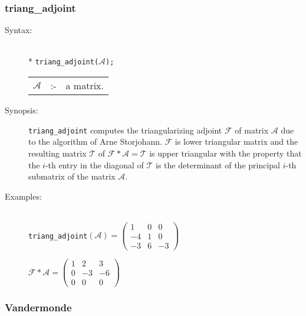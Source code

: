 \subsubsection{triang\_adjoint}
\label{linalg:triang_adjoint}

\begin{description}
\item[Syntax:]\mbox{}\\*
\texttt{triang\_adjoint($\mathcal{A}$);}\\[2mm]
\begin{tabular}{l l l}
$\mathcal{A}$  &:-& a matrix.
\end{tabular}

\item[Synopsis:]

\texttt{triang\_adjoint} computes the triangularizing adjoint $\mathcal{F}$ of
matrix $\mathcal{A}$ due to the algorithm of Arne Storjohann. $\mathcal{F}$ is
lower triangular matrix and the resulting matrix $\mathcal{T}$ of
$\mathcal{F * A = T}$ is upper triangular with the property that the $i$-th
entry in the diagonal of $\mathcal{T}$ is the determinant of the principal
$i$-th submatrix of the matrix $\mathcal{A}$.

\item[Examples:]\mbox{}\\
  \texttt{triang\_adjoint}\((\mathcal{A}) =
  \begin{pmatrix} 1 & 0 & 0 \\ -4 & 1 & 0 \\ -3 & 6 & -3 \end{pmatrix}\)

  \(\mathcal{F} * \mathcal{A} =
  \begin{pmatrix} 1 & 2 & 3 \\ 0 & -3 & -6 \\ 0 & 0 & 0 \end{pmatrix}\)
\end{description}

\subsubsection{Vandermonde}
\label{linalg:Vandermonde}

